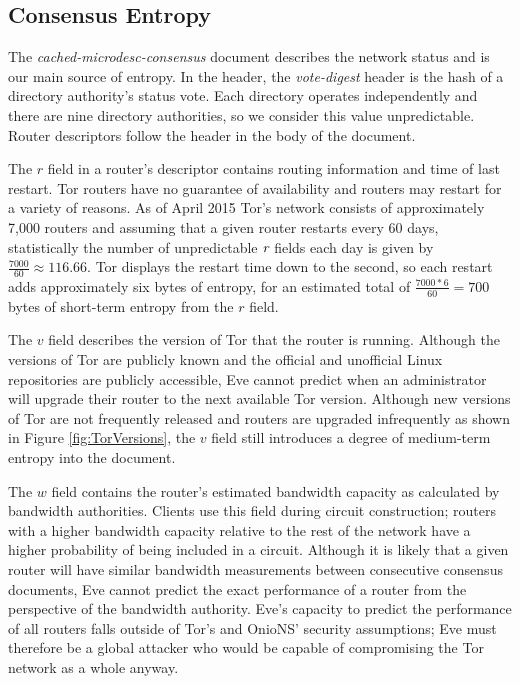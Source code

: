 \documentclass{sig-alternate}
\begin{document}
\subsection{Consensus Entropy}

The \emph{cached-microdesc-consensus} document describes the network status and is our main source of entropy. In the header, the  \emph{vote-digest} header is the hash of a directory authority's status vote. Each directory operates independently and there are nine directory authorities, so we consider this value unpredictable. Router descriptors follow the header in the body of the document. 

The $ r $ field in a router's descriptor contains routing information and time of last restart. Tor routers have no guarantee of availability and routers may restart for a variety of reasons. As of April 2015 Tor's network consists of approximately 7,000 routers \cite{TorMetrics} and assuming that a given router restarts every 60 days, statistically the number of unpredictable $ \emph{r} $ fields each day is given by $ \frac{7000}{60} \approx 116.66 $. Tor displays the restart time down to the second, so each restart adds approximately six bytes of entropy, for an estimated total of $ \frac{7000 * 6}{60} = 700 $ bytes of short-term entropy from the $ r $ field.


The $ v $ field describes the version of Tor that the router is running. Although the versions of Tor are publicly known and the official and unofficial Linux repositories are publicly accessible, Eve cannot predict when an administrator will upgrade their router to the next available Tor version. Although new versions of Tor are not frequently released and routers are upgraded infrequently as shown in Figure \ref{fig:TorVersions}, the $ v $ field still introduces a degree of medium-term entropy into the document.

The $ w $ field contains the router's estimated bandwidth capacity as calculated by bandwidth authorities. Clients use this field during circuit construction; routers with a higher bandwidth capacity relative to the rest of the network have a higher probability of being included in a circuit. Although it is likely that a given router will have similar bandwidth measurements between consecutive consensus documents, Eve cannot predict the exact performance of a router from the perspective of the bandwidth authority. Eve's capacity to predict the performance of all routers falls outside of Tor's and OnioNS' security assumptions; Eve must therefore be a global attacker who would be capable of compromising the Tor network as a whole anyway.
\end{document}
